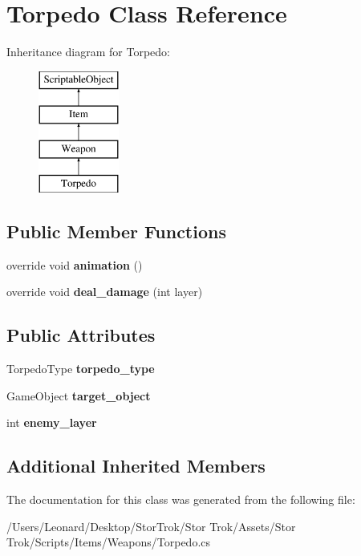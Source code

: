 \hypertarget{class_torpedo}{}\section{Torpedo Class Reference}
\label{class_torpedo}
Inheritance diagram for Torpedo\+:\begin{figure}[H]
\begin{center}
\leavevmode
\includegraphics[height=4.000000cm]{class_torpedo}
\end{center}
\end{figure}
\subsection*{Public Member Functions}
\begin{DoxyCompactItemize}
\item 
\mbox{\label{class_torpedo_aa74e33561e4e2399914adc4b1e776fc9}} 
override void {\bfseries animation} ()
\item 
\mbox{\label{class_torpedo_a9e6b806c61ce85f6a0e327052553c4da}} 
override void {\bfseries deal\+\_\+damage} (int layer)
\end{DoxyCompactItemize}
\subsection*{Public Attributes}
\begin{DoxyCompactItemize}
\item 
\mbox{\label{class_torpedo_a6ff0a344d9c6bc701083c77498dac525}} 
Torpedo\+Type {\bfseries torpedo\+\_\+type}
\item 
\mbox{\label{class_torpedo_a57eb467afc1035b36f12bed74e05fd81}} 
Game\+Object {\bfseries target\+\_\+object}
\item 
\mbox{\label{class_torpedo_a20536b6683c9893b95ff989a1306775a}} 
int {\bfseries enemy\+\_\+layer}
\end{DoxyCompactItemize}
\subsection*{Additional Inherited Members}


The documentation for this class was generated from the following file\+:\begin{DoxyCompactItemize}
\item 
/\+Users/\+Leonard/\+Desktop/\+Stor\+Trok/\+Stor Trok/\+Assets/\+Stor Trok/\+Scripts/\+Items/\+Weapons/Torpedo.\+cs\end{DoxyCompactItemize}
